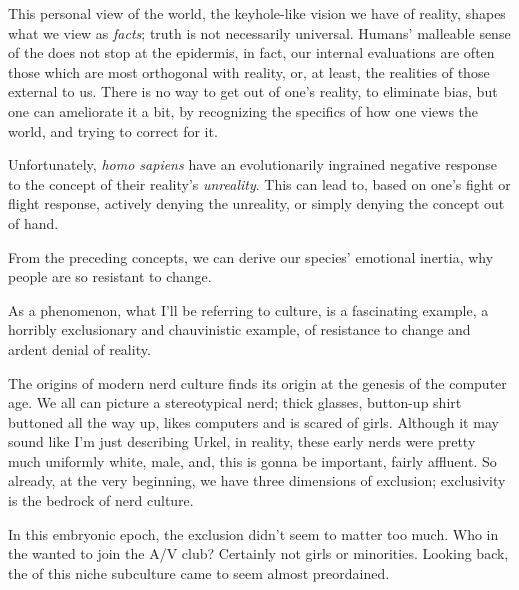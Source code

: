 \documentclass[../butidigress.tex]{subfiles}
\begin{document}
This personal view of the world, the keyhole-like vision we have of reality, shapes what we view as \emph{facts}; truth is not necessarily universal.
Humans' malleable sense of the  does not stop at the epidermis, in fact, our internal evaluations are often those which are most orthogonal with reality, or, at least, the realities of those external to us.
There is no way to get out of one's reality, to eliminate bias, but one can ameliorate it a bit, by recognizing the specifics of how one views the world, and trying to correct for it.

Unfortunately, \textit{homo sapiens} have an evolutionarily ingrained negative response to the concept of their reality's \emph{unreality}.
This can lead to, based on one's fight or flight response, actively denying the unreality, or simply denying the concept out of hand.

From the preceding concepts, we can derive our species' emotional inertia, why people are so resistant to change.

As a phenomenon, what I'll be referring to  culture, is a fascinating example, a horribly exclusionary and chauvinistic example, of resistance to change and ardent denial of reality.

\entryskip


\entryskip

The origins of modern nerd culture finds its origin at the genesis of the computer age.
We all can picture a stereotypical nerd; thick glasses, button-up shirt buttoned all the way up, likes computers and is scared of girls.
Although it may sound like I'm just describing Urkel, in reality, these early nerds were pretty much uniformly white, male, and, this is gonna be important, fairly affluent.
So already, at the very beginning, we have three dimensions of exclusion; exclusivity is the bedrock of nerd culture.

In this embryonic epoch, the exclusion didn't seem to matter too much.
Who in the  wanted to join the A/V club?
Certainly not girls or minorities.
Looking back, the  of this niche subculture came to seem almost preordained.
\end{document}
